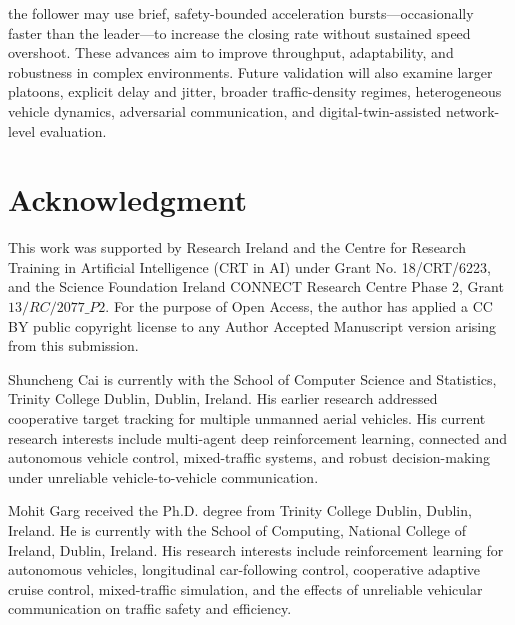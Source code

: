 \documentclass{ieeeaccess}
\begin{document}
the follower may use brief, safety-bounded acceleration bursts—occasionally faster than the leader—to increase the closing rate without sustained speed overshoot. These advances aim to improve throughput, adaptability, and robustness in complex environments. Future validation will also examine larger platoons, explicit delay and jitter, broader traffic-density regimes, heterogeneous vehicle dynamics, adversarial communication, and digital-twin-assisted network-level evaluation. %

\section*{Acknowledgment}
This work was supported by Research Ireland and the Centre for Research Training in Artificial Intelligence (CRT in AI) under Grant No. 18/CRT/6223, and the Science Foundation Ireland CONNECT Research Centre Phase 2, Grant $13/RC/2077\_P2$. For the purpose of Open Access, the author has applied a CC BY public copyright license to any Author Accepted Manuscript version arising from this submission.






\begin{IEEEbiographynophoto}{Shuncheng Cai}
is currently with the School of Computer Science and Statistics, Trinity
College Dublin, Dublin, Ireland. His earlier research addressed cooperative
target tracking for multiple unmanned aerial vehicles. His current research
interests include multi-agent deep reinforcement learning, connected and
autonomous vehicle control, mixed-traffic systems, and robust decision-making
under unreliable vehicle-to-vehicle communication.
\end{IEEEbiographynophoto}


\begin{IEEEbiographynophoto}{Mohit Garg}
received the Ph.D. degree from Trinity College Dublin, Dublin, Ireland. He is
currently with the School of Computing, National College of Ireland, Dublin,
Ireland. His research interests include reinforcement learning for autonomous
vehicles, longitudinal car-following control, cooperative adaptive cruise
control, mixed-traffic simulation, and the effects of unreliable vehicular
communication on traffic safety and efficiency.
\end{IEEEbiographynophoto}
\end{document}
